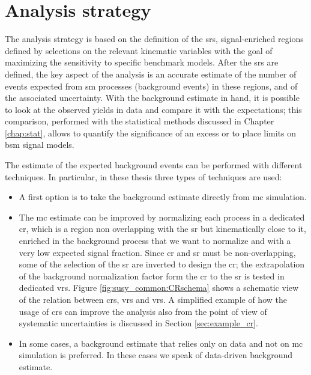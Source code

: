 \section{Analysis strategy}
\label{sec:analysisstrategy}

The analysis strategy is based on the definition of the \glspl{sr}, signal-enriched regions defined by selections on the relevant kinematic variables with the goal of maximizing the sensitivity to specific benchmark models. 
After the \glspl{sr} are defined, the key aspect of the analysis is an accurate estimate of the number of events expected from \gls{sm} processes (background events) in these regions, and of the associated uncertainty. 
With the background estimate in hand, it is possible to look at the observed yields in data and compare it with the expectations;
this comparison, performed with the statistical methods discussed in Chapter \ref{chap:stat}, allows to quantify the significance of an excess or to place limits on \gls{bsm} signal models.

The estimate of the expected background events can be performed with different techniques. In particular, in these thesis three types of techniques are used:
\begin{itemize}
\item A first option is to take the background estimate directly from \gls{mc} simulation. 
\item The \gls{mc} estimate can be improved by normalizing each process in a dedicated \gls{cr}, which is a region non overlapping with the \gls{sr} but kinematically close to it, enriched in the background process that we want to normalize and with a very low expected signal fraction. Since \gls{cr} and \gls{sr} must be non-overlapping, some of the selection of the \gls{sr} are inverted to design the \gls{cr}; the extrapolation of the background normalization factor form the \gls{cr} to the \gls{sr} is tested in dedicated \glspl{vr}. Figure \ref{fig:susy_common:CRschema} shows a schematic view of the relation between \glspl{cr}, \glspl{vr} and \glspl{vr}. A simplified example of how the usage of \glspl{cr} can improve the analysis also from the point of view of systematic uncertainties is discussed in Section \ref{sec:example_cr}. 
\item In some cases, a background estimate that relies only on data and not on \gls{mc} simulation is preferred. In these cases we speak of data-driven background estimate.
\end{itemize}

